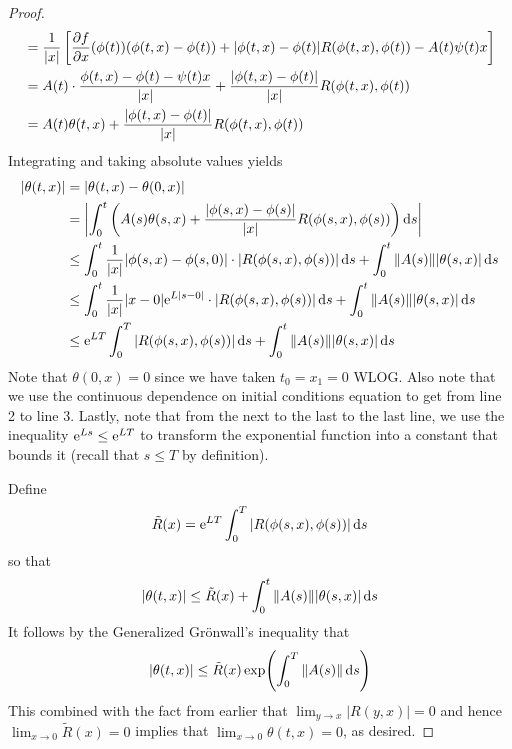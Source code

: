 \documentclass[../notes.tex]{subfiles}
\begin{document}
\begin{itemize}
\begin{proof}
\begin{align*}
            &= \frac{1}{|x|}\left[ {\pdv{f}{x}}(\phi(t))(\phi(t,x)-\phi(t))+|\phi(t,x)-\phi(t)|R(\phi(t,x),\phi(t))-A(t)\psi(t)x \right]\\
            &= A(t)\cdot\frac{\phi(t,x)-\phi(t)-\psi(t)x}{|x|}+\frac{|\phi(t,x)-\phi(t)|}{|x|}R(\phi(t,x),\phi(t))\\
            &= A(t)\theta(t,x)+\frac{|\phi(t,x)-\phi(t)|}{|x|}R(\phi(t,x),\phi(t))
        \end{align*}
        Integrating and taking absolute values yields
        \begin{align*}
            |\theta(t,x)| &= |\theta(t,x)-\theta(0,x)|\\
            &= \left| \int_0^t\left( A(s)\theta(s,x)+\frac{|\phi(s,x)-\phi(s)|}{|x|}R(\phi(s,x),\phi(s)) \right)\dd{s} \right|\\
            &\leq \int_0^t\frac{1}{|x|}|\phi(s,x)-\phi(s,0)|\cdot|R(\phi(s,x),\phi(s))|\dd{s}+\int_0^t\norm{A(s)}|\theta(s,x)|\dd{s}\\
            &\leq \int_0^t\frac{1}{|x|}|x-0|\e[L|s-0|]\cdot|R(\phi(s,x),\phi(s))|\dd{s}+\int_0^t\norm{A(s)}|\theta(s,x)|\dd{s}\\
            &\leq \e[LT]\int_0^T|R(\phi(s,x),\phi(s))|\dd{s}+\int_0^t\norm{A(s)}|\theta(s,x)|\dd{s}
        \end{align*}
        Note that $\theta(0,x)=0$ since we have taken $t_0=x_1=0$ WLOG. Also note that we use the continuous dependence on initial conditions equation to get from line 2 to line 3. Lastly, note that from the next to the last to the last line, we use the inequality $\e[Ls]\leq\e[LT]$ to transform the exponential function into a constant that bounds it (recall that $s\leq T$ by definition).\par
        Define
        \begin{equation*}
            \tilde{R}(x) = \e[LT]\int_0^T|R(\phi(s,x),\phi(s))|\dd{s}
        \end{equation*}
        so that
        \begin{equation*}
            |\theta(t,x)| \leq \tilde{R}(x)+\int_0^t\norm{A(s)}|\theta(s,x)|\dd{s}
        \end{equation*}
        It follows by the Generalized Gr\"{o}nwall's inequality that
        \begin{equation*}
            |\theta(t,x)| \leq \tilde{R}(x)\exp(\int_0^T\norm{A(s)}\dd{s})
        \end{equation*}
        This combined with the fact from earlier that $\lim_{y\to x}|R(y,x)|=0$ and hence $\lim_{x\to 0}\tilde{R}(x)=0$ implies that $\lim_{x\to 0}\theta(t,x)=0$, as desired.\par

\end{proof}
\end{itemize}
\end{document}
